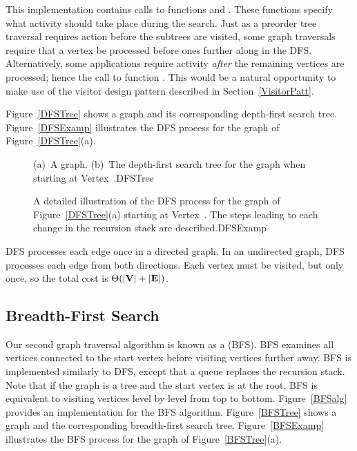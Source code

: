 
This implementation contains calls to functions  and
.
These functions specify what activity should take place during the
search.
Just as a preorder tree traversal requires action before the subtrees
are visited, some graph traversals require that a vertex be processed
before ones further along in the DFS.
Alternatively, some applications require activity \emph{after} the
remaining vertices are processed; hence the call to function
.
This would be a natural opportunity to make use of the visitor design
pattern described in
Section~\ref{VisitorPatt}.

Figure~\ref{DFSTree} shows a graph and its corresponding depth-first
search tree.
Figure~\ref{DFSExamp} illustrates the DFS process for the graph of
Figure~\ref{DFSTree}(a).
 
\begin{figure}
{(a)~A graph.
(b)~The depth-first search tree for the graph when starting at
Vertex~.}{DFSTree}
\medskip
\end{figure}

\begin{figure}
{A detailed illustration of the DFS process for the graph of
Figure~\ref{DFSTree}(a) starting at Vertex~.
The steps leading to each change in the recursion stack
are described.}{DFSExamp}
\end{figure}

DFS processes each edge once in a directed graph.
In an undirected graph, DFS processes each edge from both
directions.
Each vertex must be visited, but only once, so the total cost is
\(\Theta(|{\textbf{V}}| + |{\textbf{E}}|)\).

\subsection{Breadth-First Search}

Our second graph traversal algorithm is known as a
 (BFS).
BFS examines all vertices connected to the start vertex
before visiting vertices further away.
BFS is implemented similarly to DFS, except that a queue
replaces the recursion stack.
Note that if the graph is a tree and the start vertex is at the root,
BFS is equivalent to visiting vertices level by level from top to
bottom.
Figure~\ref{BFSalg} provides an implementation for the BFS algorithm.
Figure~\ref{BFSTree} shows a graph and the corresponding breadth-first
search tree.
Figure~\ref{BFSExamp} illustrates the BFS process for the graph of
Figure~\ref{BFSTree}(a).

